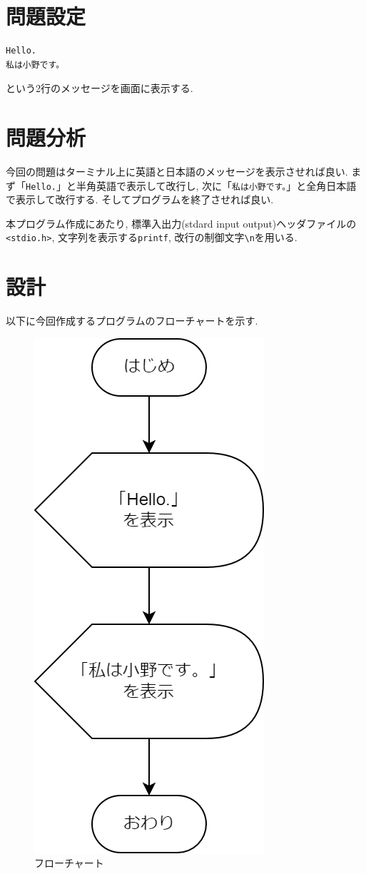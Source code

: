 \documentclass[a4paper, xelatex, ja=standard, 10.5pt]{bxjsarticle}
\begin{document}


\section{問題設定}
\begin{lstlisting}
Hello.
私は小野です。
\end{lstlisting}
という2行のメッセージを画面に表示する.

\section{問題分析}
今回の問題はターミナル上に英語と日本語のメッセージを表示させれば良い.
まず「\texttt{Hello.}」と半角英語で表示して改行し,
次に「\texttt{私は小野です。}」と全角日本語で表示して改行する.
そしてプログラムを終了させれば良い.

本プログラム作成にあたり,
標準入出力(stdard input output)ヘッダファイルの\texttt{<stdio.h>},
文字列を表示する\texttt{printf},
改行の制御文字\texttt{\textbackslash n}を用いる.

\section{設計}
以下に今回作成するプログラムのフローチャートを示す.

\begin{figure}[H]
\centering
\includegraphics[scale=0.5]{img/flowchart.drawio.png}
\caption{フローチャート}
\label{}
\end{figure}
\end{document}

